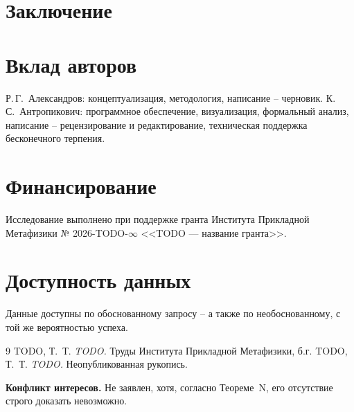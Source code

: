 \documentclass[11pt,a4paper]{article}
\begin{document}
\section{Заключение}

\section*{Вклад авторов}
Р.\,Г.~Александров: концептуализация, методология, написание -- черновик.
К.\,С.~Антропикович: программное обеспечение, визуализация, формальный анализ,
написание -- рецензирование и редактирование, техническая поддержка бесконечного терпения.

\section*{Финансирование}
Исследование выполнено при поддержке гранта Института Прикладной Метафизики
№ 2026-TODO-$\infty$ <<TODO — название гранта>>.

\section*{Доступность данных}
Данные доступны по обоснованному запросу -- а также по необоснованному, с той же
вероятностью успеха.

\begin{thebibliography}{9}
 TODO, Т.~Т. \textit{TODO.} Труды Института Прикладной Метафизики, б.г.
 TODO, Т.~Т. \textit{TODO.} Неопубликованная рукопись.
\end{thebibliography}

\noindent\textbf{Конфликт интересов.} Не заявлен, хотя, согласно Теореме~N,
его отсутствие строго доказать невозможно.
\end{document}
